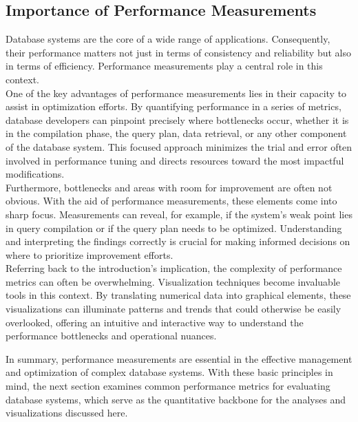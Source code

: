 \subsection{Importance of Performance Measurements}
Database systems are the core of a wide range of applications. Consequently, their performance matters not just in terms of consistency and reliability but also in terms of efficiency. Performance measurements play a central role in this context.\\
One of the key advantages of performance measurements lies in their capacity to assist in optimization efforts. By quantifying performance in a series of metrics, database developers can pinpoint precisely where bottlenecks occur, whether it is in the compilation phase, the query plan, data retrieval, or any other component of the database system. This focused approach minimizes the trial and error often involved in performance tuning and directs resources toward the most impactful modifications.\\
Furthermore, bottlenecks and areas with room for improvement are often not obvious. With the aid of performance measurements, these elements come into sharp focus. Measurements can reveal, for example, if the system's weak point lies in query compilation or if the query plan needs to be optimized. Understanding and interpreting the findings correctly is crucial for making informed decisions on where to prioritize improvement efforts.\\

Referring back to the introduction's implication, the complexity of performance metrics can often be overwhelming. Visualization techniques become invaluable tools in this context. By translating numerical data into graphical elements, these visualizations can illuminate patterns and trends that could otherwise be easily overlooked, offering an intuitive and interactive way to understand the performance bottlenecks and operational nuances.

In summary, performance measurements are essential in the effective management and optimization of complex database systems. With these basic principles in mind, the next section examines common performance metrics for evaluating database systems, which serve as the quantitative backbone for the analyses and visualizations discussed here.

